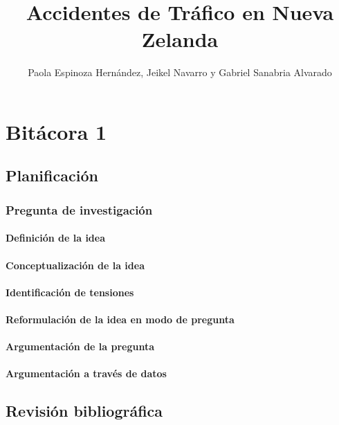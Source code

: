 \documentclass{book}
\title{Accidentes de Tráfico en Nueva Zelanda}
\author{Paola Espinoza Hernández, Jeikel Navarro y Gabriel Sanabria Alvarado}
\begin{document}
\maketitle


\chapter*{Bitácora 1}

\section{Planificación}

\subsection{Pregunta de investigación}

\subsubsection{Definición de la idea}

\subsubsection{Conceptualización de la idea}

\subsubsection{Identificación de tensiones}

\subsubsection{Reformulación de la idea en modo de pregunta}

\subsubsection{Argumentación de la pregunta}

\subsubsection{Argumentación a través de datos}

\section{Revisión bibliográfica}
\end{document}
